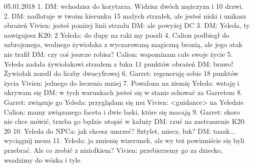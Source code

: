\documentclass[10pt,twoside,twocolumn]{book}
\begin{document}
05.01.2018
1. DM: wchodzisz do korytarza. Widzisz dwóch mężczyzn i 10 drzwi.
2. DM: nadlatuje w twoim kierunku 15 małych strzałek, ale jesteś niski i unikasz obrażeń Vivien: jesteś poniżej linii strzału DM: ale powyżej DC
3. DM: Yeleda, ty nawigujesz K20: 2 Yeleda: do dupy na raki my poszli
4. Calion podbiegł do uzbrojonego, wodnego żywiołaka z wyczarowaną magiczną bronią, ale jego atak nie trafił DM: czy coś jeszcze robisz? Calion: wspominam całe swoje życie
5. Yeleda zadała żywiołakowi strzałem z łuku 11 punktów obrażeń DM: brawo! Żywiołak zszedł do liczby dwucyfrowej
6. Garret: regeneruję sobie 18 punktów życia Vivien: jednego do leczenia mniej
7. Powalona na ziemię Yeleda: wstaję i ukrywam się DM: w tych warunkach jesteś się w stanie schować za Garretem
8. Garret: związuje go Yeleda: przyglądam się mu Vivien: <guidance> na Yeledzie Calion: mamy związanego faceta i dwie laski, które się macają
9. Garret: skoro nie chce mówić, trzeba go będzie utopić w kałuży DM: rzuć na zastraszenie K20: 20
10. Yeleda do NPCa: jak chcesz umrzeć? Sztylet, miecz, łuk? DM: taaak... wyciągnij menu
11. Yeleda: ja zmienię wizerunek, ale wy też powinniście się byli przebrać. Ale co zrobić z niziołkiem? Vivien: przebierzemy go za dziecko, wsadzimy do wózka i tyle




%    
%       
\end{document}
